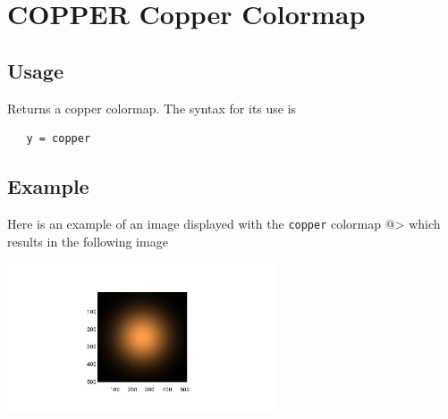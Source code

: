 \section{COPPER Copper Colormap}

\subsection{Usage}

Returns a copper colormap.  The syntax for its use is
\begin{verbatim}
   y = copper
\end{verbatim}
\subsection{Example}

Here is an example of an image displayed with the \verb|copper|
colormap
@>
which results in the following image


\centerline{\includegraphics[width=8cm]{copper1}}

